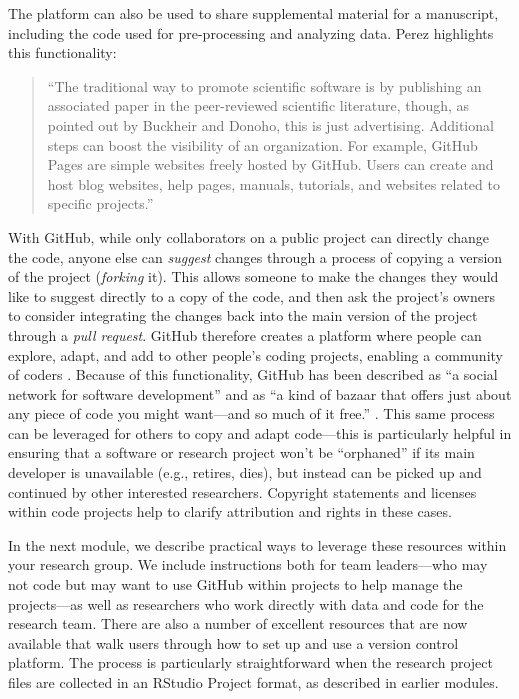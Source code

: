 \documentclass[]{tufte-book}
\begin{document}
The platform can also be used to share supplemental material for a manuscript,
including the code used for pre-processing and analyzing data. Perez highlights
this functionality:

\begin{quote}
``The traditional way to promote scientific software is by publishing an
associated paper in the peer-reviewed scientific literature, though, as pointed
out by Buckheir and Donoho, this is just advertising. Additional steps can boost
the visibility of an organization. For example, GitHub Pages are simple websites
freely hosted by GitHub. Users can create and host blog websites, help pages,
manuals, tutorials, and websites related to specific projects.'' \citep{perez2016ten}
\end{quote}

With GitHub, while only collaborators on a public project can directly change
the code, anyone else can \emph{suggest} changes through a process of copying a
version of the project (\emph{forking} it). This allows someone to make the changes
they would like to suggest directly to a copy of the code, and then ask the
project's owners to consider integrating the changes back into the main version
of the project through a \emph{pull request}. GitHub therefore creates a platform
where people can explore, adapt, and add to other people's coding projects,
enabling a community of coders \citep{perez2016ten}. Because of this
functionality, GitHub has been described as ``a social network for software
development'' \citep{perkel2018git} and as ``a kind of bazaar that offers just about
any piece of code you might want---and so much of it free.'' \citep{metz2015github}.
This same process can be leveraged for others to copy and adapt code---this is
particularly helpful in ensuring that a software or research project won't be
``orphaned'' if its main developer is unavailable (e.g., retires, dies), but
instead can be picked up and continued by other interested researchers.
Copyright statements and licenses within code projects help to clarify
attribution and rights in these cases.

In the next module, we describe practical ways to leverage these resources
within your research group. We include instructions both for team leaders---who
may not code but may want to use GitHub within projects to help manage the
projects---as well as researchers who work directly with data and code for the
research team. There are also a number of excellent resources that are now
available that walk users through how to set up and use a version control
platform. The process is particularly straightforward when the research project
files are collected in an RStudio Project format, as described in earlier
modules.
\end{document}
